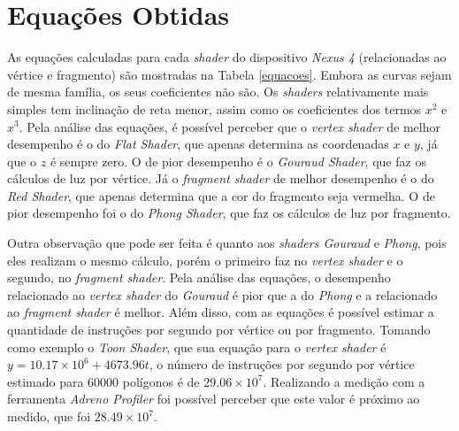 \section{Equações Obtidas} 	

	As equações calculadas para cada \textit{shader} do dispositivo \textit{Nexus 4} (relacionadas ao vértice e fragmento) são mostradas na Tabela \ref{equacoes}. Embora as curvas sejam de mesma família, os seus coeficientes não são. Os \textit{shaders} relativamente mais simples tem inclinação de reta menor, assim como os coeficientes dos termos $x^2$ e $x^3$. Pela análise das equações, é possível perceber que o \textit{vertex shader} de melhor desempenho é o do \textit{Flat Shader}, que apenas determina as coordenadas $x$ e $y$, já que o $z$ é sempre zero. O de pior desempenho é o \textit{Gouraud Shader}, que faz os cálculos de luz por vértice. Já o \textit{fragment shader} de melhor desempenho é o do \textit{Red Shader}, que apenas determina que a cor do fragmento seja vermelha. O de pior desempenho foi o do \textit{Phong Shader}, que faz os cálculos de luz por fragmento.

	Outra observação que pode ser feita é quanto aos \textit{shaders Gouraud} e \textit{Phong}, pois eles realizam o mesmo cálculo, porém o primeiro faz no \textit{vertex shader} e o segundo, no \textit{fragment shader}. Pela análise das equações, o desempenho relacionado ao \textit{vertex shader} do \textit{Gouraud} é pior que a do \textit{Phong} e a relacionado ao \textit{fragment shader} é melhor.  Além disso, com as equações é possível estimar a quantidade de instruções por segundo por vértice ou por fragmento. Tomando como exemplo o \textit{Toon Shader}, que sua equação para o \textit{vertex shader} é  $y = 10.17 \times 10^6 + 4673.96t$, o número de instruções por segundo por vértice estimado para 60000 polígonos é de $29.06 \times 10^7$. Realizando a medição com a ferramenta \textit{Adreno Profiler} foi possível perceber que este valor é próximo ao medido, que foi $28.49 \times 10^7$.

